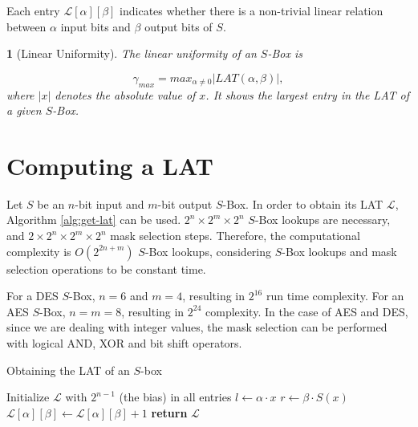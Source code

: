 \documentclass{report}
\newtheorem*{concept}{}{\bfseries}{\itshape}
\begin{document}
Each entry $\mathcal{L}[\alpha][\beta]$ indicates whether there is a non-trivial linear relation between $\alpha$ input bits and $\beta$ output bits of $S$.

\begin{concept}[Linear Uniformity]
The linear uniformity of an $S$-Box is 

$$\gamma_{max} = max_{\alpha\not= 0} |LAT(\alpha,\beta)|,$$ 
where $|x|$ denotes the absolute value of $x$. It shows the largest entry in the LAT of a given $S$-Box.
\end{concept}

\section{Computing a LAT}

Let $S$ be an $n$-bit input and $m$-bit output $S$-Box. In order to obtain its LAT $\mathcal{L}$, Algorithm \ref{alg:get-lat} can be used. $2^{n} \times 2^{m} \times 2^{n}$ $S$-Box lookups are necessary, and $2 \times 2^{n} \times 2^{m} \times 2^{n}$ mask selection steps. Therefore, the computational complexity is $O(2^{2n + m})$ $S$-Box lookups, considering $S$-Box lookups and mask selection operations to be constant time.

For a DES $S$-Box, $n = 6$ and $m = 4$, resulting in $2^{16}$ run time complexity. For an AES $S$-Box, $n = m = 8$, resulting in $2^{24}$ complexity. In the case of AES and DES, since we are dealing with integer values, the mask selection can be performed with logical AND, XOR and bit shift operators.

\begin{algorithm}[H]
\caption{Obtaining the LAT of an $S$-box}
\label{alg:get-lat}
\begin{algorithmic}[1]
    \State Initialize $\mathcal{L}$ with $2^{n-1}$ (the bias) in all entries
                \State $l \gets \alpha \cdot x$ 
                \State $r \gets \beta \cdot S(x)$ 
                    \State $\mathcal{L}[\alpha][\beta] \gets \mathcal{L}[\alpha][\beta] + 1$
                \EndIf
            \EndFor
        \EndFor
    \EndFor
\State \textbf{return} $\mathcal{L}$
\end{algorithmic}
\end{algorithm}
\end{document}
